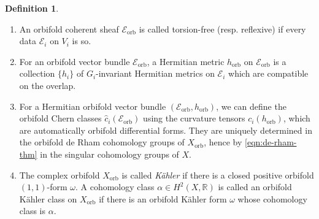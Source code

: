 \documentclass[12pt]{amsart}
\newcommand{\<}{\leq}
\def\mcE{\mathcal{E}}
\theoremstyle{remark}
\theoremstyle{definition}
\newtheorem{definition}[theorem]{Definition}
\theoremstyle{definition}
\numberwithin{equation}{section}
\theoremstyle{definition}
\theoremstyle{definition}
\def\orb{\mathrm{orb}}
\begin{document}
\begin{definition}
\begin{enumerate}
        \item An orbifold coherent sheaf $\mcE_{\orb}$ is called torsion-free (resp. reflexive) if every data $\mcE_i$ on $V_i$ is so.




        \item For an orbifold vector bundle $\mcE_{\orb}$,  a Hermitian metric $h_{\orb}$ on $\mcE_{\orb}$ is a collection $\{h_i\}$ of $G_i$-invariant Hermitian metrics on $\mcE_i$ which are compatible on the overlap.  

        

        \item For a Hermitian orbifold vector bundle $(\mcE_{\orb}, h_{\orb})$, 
        we can define the orbifold Chern classes $\hat{c}_i (\mcE_{\orb})$  using the curvature tensors $c_i(h_{\orb})$, which are automatically orbifold differential forms.  
        They are uniquely determined in the orbifold de Rham cohomology groups of $X_{\orb}$, hence by \eqref{eqn:de-rham-thm} in the singular cohomology groups of  $X$.  

        \item The  complex orbifold $X_{\orb}$ is called \textit{ K\"ahler} if there is a closed  positive orbifold $(1,1)$-form $\omega$. 
 A cohomology class $\alpha \in H^2(X, \mathbb{R})$ is called an orbifold K\"ahler class on $X_{\orb}$ if there is an orbifold K\"ahler form $\omega$ whose cohomology class is $\alpha$. 
    \end{enumerate}
\end{definition}

\end{document}
